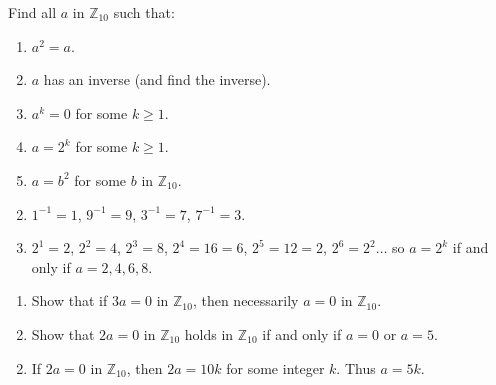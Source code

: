 \begin{multicols}{2}
\begin{ex}
Find all $a$ in $\mathbb{Z}_{10}$ such that:

\begin{enumerate}[label={\alph*.}]
\item $a^{2} = a$.

\item $a$ has an inverse (and find the inverse).

\item $a^{k} = 0$ for some $k \geq 1$.

\item $a = 2^{k}$ for some $k \geq 1$.

\item $a = b^{2}$ for some $b$ in $\mathbb{Z}_{10}$.
\end{enumerate}
\begin{sol}
\begin{enumerate}[label={\alph*.}]
\setcounter{enumi}{1}
\item  $1^{-1} = 1$, $9^{-1} = 9$, $3^{-1} = 7$, $7^{-1} = 3$.

\setcounter{enumi}{3}
\item  $2^{1} = 2$, $2^{2} = 4$, $2^{3} = 8$, $2^{4} = 16 = 6$, $2^{5} = 12 = 2$, $2^{6} =
  2^{2} \dots$  so $a = 2^k$ if and only if $a = 2, 4, 6, 8$.

\end{enumerate}
\end{sol}
\end{ex}

\begin{ex}
\begin{enumerate}[label={\alph*.}]
\item Show that if $3a = 0$ in $\mathbb{Z}_{10}$, then necessarily $a = 0$ in $\mathbb{Z}_{10}$.

\item Show that $2a = 0$ in $\mathbb{Z}_{10}$  holds in $\mathbb{Z}_{10}$ if and only if $a = 0$ or $a = 5$.

\end{enumerate}
\begin{sol}
\begin{enumerate}[label={\alph*.}]
\setcounter{enumi}{1}
\item  If $2a = 0$ in $\mathbb{Z}_{10}$, then $2a = 10k$ for some integer $k$. Thus $a = 5k$.

\end{enumerate}
\end{sol}
\end{ex}



\end{multicols}
